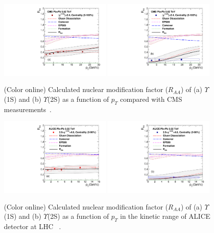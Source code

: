 \documentclass[12pt,a4paper,final]{iopart} %
\begin{document}
\begin{figure}
\includegraphics[width=0.49\textwidth]{Fig6a_Y1S_CMS_RAAPt_Shade.pdf}
\includegraphics[width=0.49\textwidth]{Fig6b_Y2S_CMS_RAAPt_Shade.pdf}
\caption{(Color online) Calculated nuclear modification factor ($R_{AA}$) of (a) $\Upsilon$(1S) and 
  (b) $\Upsilon$(2S) as a function of $p_{T}$ 
  compared with CMS measurements~\cite{CMS:2017ucd}.}
\label{fig:UpsilonRaaPtCMS}
\end{figure}



\begin{figure}
\includegraphics[width=0.49\textwidth]{Fig7a_ALICE_Y1SRAAPt_Shade.pdf}
\includegraphics[width=0.49\textwidth]{Fig7b_ALICE_Y2SRAAPt_Shade.pdf}
\caption{(Color online) Calculated nuclear modification factor ($R_{AA}$) of (a) $\Upsilon$(1S) and 
  (b) $\Upsilon$(2S) as a function of $p_{T}$ in the kinetic range of ALICE detector at LHC ~\cite{ALICE:Y5TeV}.} 
  
\label{fig:UpsilonRaaPtALICE}
\end{figure}
\end{document}
